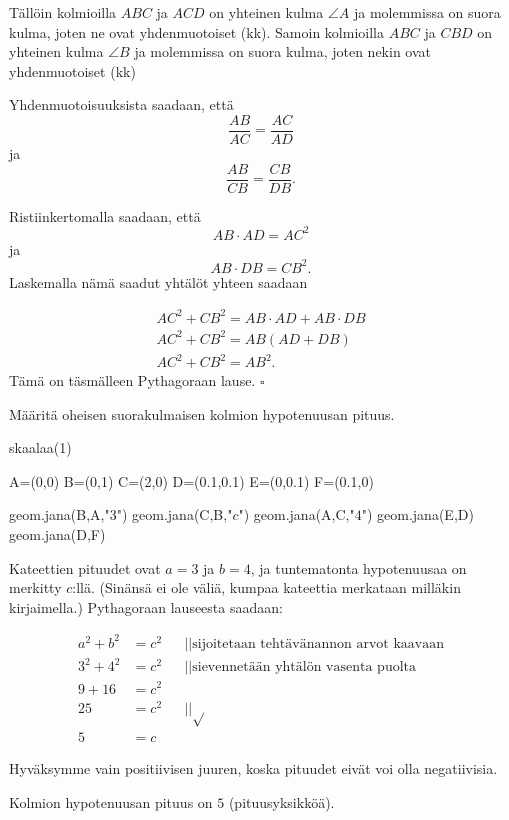 Tällöin kolmioilla $ABC$ ja $ACD$ on yhteinen kulma $\angle A$ ja molemmissa on suora kulma, joten ne ovat yhdenmuotoiset (kk). Samoin kolmioilla $ABC$ ja $CBD$ on yhteinen kulma $\angle B$ ja molemmissa on suora kulma, joten nekin ovat yhdenmuotoiset (kk)

Yhdenmuotoisuuksista saadaan, että
\[
\frac{AB}{AC} = \frac{AC}{AD}
\]
ja
\[
\frac{AB}{CB} = \frac{CB}{DB}.
\]

Ristiinkertomalla saadaan, että
\[
AB \cdot AD = AC^2
\]
ja
\[
AB \cdot DB = CB^2.
\]
Laskemalla nämä saadut yhtälöt yhteen saadaan

\begin{align*}
AC^2 + CB^2  = AB \cdot AD + AB \cdot DB \\
AC^2 + CB^2  = AB(AD + DB) \\
AC^2 + CB^2  = AB^2.
\end{align*}
Tämä on täsmälleen Pythagoraan lause. $\square $

\begin{esimerkki}
Määritä oheisen suorakulmaisen kolmion hypotenuusan pituus.
\begin{center}
\begin{kuva}
	skaalaa(1)

	A=(0,0)
	B=(0,1)
	C=(2,0)
	D=(0.1,0.1)
	E=(0,0.1)
	F=(0.1,0)

	geom.jana(B,A,"$3$")
	geom.jana(C,B,"$c$")
	geom.jana(A,C,"$4$")
	geom.jana(E,D)
	geom.jana(D,F)
\end{kuva}
\end{center}

\begin{esimratk}
Kateettien pituudet ovat $a=3$ ja $b=4$, ja tuntematonta hypotenuusaa on merkitty $c$:llä. (Sinänsä ei ole väliä, kumpaa kateettia merkataan milläkin kirjaimella.) Pythagoraan lauseesta saadaan:

\begin{align*}
a^2+b^2 &= c^2  && || \text{sijoitetaan tehtävänannon arvot kaavaan} \\
3^2+4^2 &= c^2 && || \text{sievennetään yhtälön vasenta puolta} \\
9+16 &= c^2 && \\
25 &= c^2 && || \sqrt{} \\
5 &= c &&
\end{align*}

Hyväksymme vain positiivisen juuren, koska pituudet eivät voi olla negatiivisia.

\end{esimratk}
	\begin{esimvast}
Kolmion hypotenuusan pituus on $5$ (pituusyksikköä).
	\end{esimvast}
\end{esimerkki}

